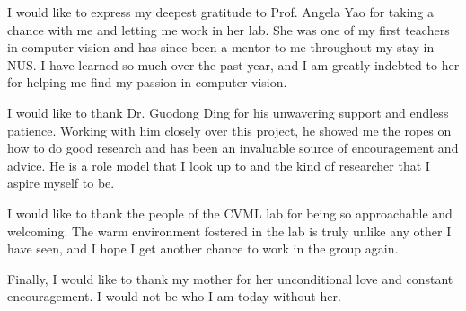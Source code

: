 \begin{acknowledgments}

I would like to express my deepest gratitude to Prof. Angela Yao for taking a chance with me and letting me work in her lab. She was one of my first teachers in computer vision and has since been a mentor to me throughout my stay in NUS. I have learned so much over the past year, and I am greatly indebted to her for helping me find my passion in computer vision.

I would like to thank Dr. Guodong Ding for his unwavering support and endless patience. Working with him closely over this project, he showed me the ropes on how to do good research and has been an invaluable source of encouragement and advice. He is a role model that I look up to and the kind of researcher that I aspire myself to be.

I would like to thank the people of the CVML lab for being so approachable and welcoming. The warm environment fostered in the lab is truly unlike any other I have seen, and I hope I get another chance to work in the group again.

Finally, I would like to thank my mother for her unconditional love and constant encouragement. I would not be who I am today without her.

\end{acknowledgments}
